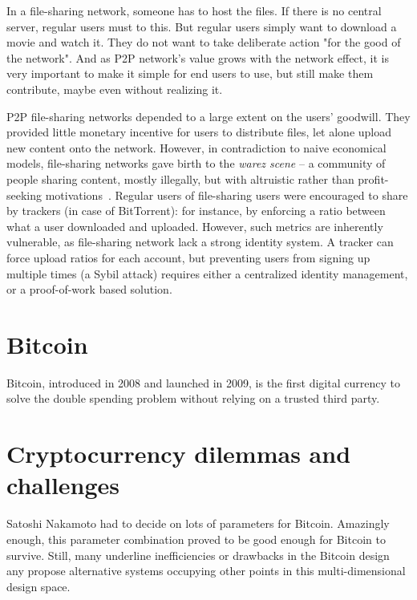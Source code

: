In a file-sharing network, someone has to host the files.
If there is no central server, regular users must to this.
But regular users simply want to download a movie and watch it.
They do not want to take deliberate action "for the good of the network".
And as P2P network's value grows with the network effect, it is very important to make it simple for end users to use, but still make them contribute, maybe even without realizing it.

P2P file-sharing networks depended to a large extent on the users' goodwill.
They provided little monetary incentive for users to distribute files, let alone upload new content onto the network.
However, in contradiction to naive economical models, file-sharing networks gave birth to the \textit{warez scene} -- a community of people sharing content, mostly illegally, but with altruistic rather than profit-seeking motivations~\cite{Rehn2004}.
Regular users of file-sharing users were encouraged to share by trackers (in case of BitTorrent): for instance, by enforcing a ratio between what a user downloaded and uploaded.
However, such metrics are inherently vulnerable, as file-sharing network lack a strong identity system.
A tracker can force upload ratios for each account, but preventing users from signing up multiple times (a Sybil attack) requires either a centralized identity management, or a proof-of-work based solution.














\section{Bitcoin}

Bitcoin, introduced in 2008 and launched in 2009, is the first digital currency to solve the double spending problem without relying on a trusted third party.



\section{Cryptocurrency dilemmas and challenges}

Satoshi Nakamoto had to decide on lots of parameters for Bitcoin.
Amazingly enough, this parameter combination proved to be good enough for Bitcoin to survive.
Still, many underline inefficiencies or drawbacks in the Bitcoin design any propose alternative systems occupying other points in this multi-dimensional design space.

